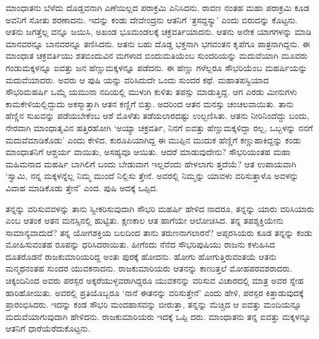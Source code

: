 ಮಾಂಧಾತನು ಬೆಳೆದು ದೊಡ್ಡವನಾಗಿ ಎಣೆಯಿಲ್ಲದ ಪರಾಕ್ರಮಿ ಎನಿಸಿದನು. ರಾವಣ ನಂತಹ ಮಹಾ ಪರಾಕ್ರಮಿ ಕೂಡ ಅವನಿಗೆ ಸೋತು ಶರಣಾದನು. ಇದನ್ನು ಕಂಡು ದೇವೇಂದ್ರನು ಆತನಿಗೆ ‘ತ್ರಸದ್ದಸ್ಯು’ ಎಂದು ಬಿರುದನ್ನು ಕೊಟ್ಟನು. ಆತನು ಜಗತ್ತೆಲ್ಲ ವನ್ನೂ ಜಯಿಸಿ, ಅಖಂಡ ಭೂಮಂಡಲಕ್ಕೆ ಚಕ್ರವರ್ತಿಯಾದನು. ಆತನು ಅನೇಕ ಯಾಗಗಳನ್ನು ಮಾಡಿ ಮಾನವರನ್ನೂ ಬಾನವರನ್ನೂ ತಣಿಸಿದನು. ಆತನು ಬಹು ದೊಡ್ಡ ಭಕ್ತನಾಗಿ ಭಗವಂತನ ಕೃಪೆಗೂ ಪಾತ್ರನಾಗಿದ್ದನು. ಈ ಮಾಂಧಾತ ಚಕ್ರವರ್ತಿಯು ಶತಬಿಂದುವಿನ ಮಗಳಾದ ಬಿಂದುಮತಿಯೆಂಬ ಸುಂದರಿಯನ್ನು ಮದುವೆಯಾಗಿ ಮೂವರು ಗಂಡುಮಕ್ಕಳನ್ನೂ ಐವತ್ತು ಜನ ಹೆಣ್ಣುಮಕ್ಕಳನ್ನೂ ಪಡೆದನು. ಈ ಹೆಣ್ಣು ಗಳೆಲ್ಲರೂ ಸೌಭರಿಯೆಂಬ ಮಹರ್ಷಿಯನ್ನು ಮದುವೆಯಾದರು. ಅವರು ಆ ಪುಷಿ ಯನ್ನು ವರಿಸಿದುದೇ ಒಂದು ಸುಂದರ ಕಥೆ. ಮಹಾತಪಸ್ವಿಯಾದ ಸೌಭರಿಮಹರ್ಷಿ ಒಮ್ಮೆ ಯಮುನಾ ನದಿಯಲ್ಲಿ ಮುಳುಗಿ ಕುಳಿತು ತಪಸ್ಸು ಮಾಡುತ್ತಿದ್ದ. ಆಗ ಎರಡು ಮೀನುಗಳು ಕಾಮಕೇಳಿಯಲ್ಲಿದ್ದುದು ಅಕಸ್ಮಾತ್ತಾಗಿ ಆತನ ಕಣ್ಣಿಗೆ ಬಿತ್ತು. ಅದರಿಂದ ಆತನ ಮನಸ್ಸು ಚಂಚಲವಾಯಿತು. ತಾನು ಹೆಣ್ಣಿನ ಸುಖವನ್ನು ಪಡೆಯಬೇಕೆಂಬ ಆಶೆ ಮೊಳೆತು ತಡೆಯಲಾರದಷ್ಟು ಉಲ್ಬಣಿಸಿತು. ಆತನು ನೀರಿನಿಂದೆದ್ದು ಬಂದು, ನೇರವಾಗಿ ಮಾಂಧಾತೃವಿನ ಹತ್ತಿರಹೋಗಿ ‘ಅಯ್ಯಾ ಚಕ್ರವರ್ತಿ, ನಿನಗೆ ಐವತ್ತು ಹೆಣ್ಣುಮಕ್ಕಳಿದ್ದಾ ರಲ್ಲ, ಒಬ್ಬಳನ್ನು ನನಗೆ ಮದುವೆಮಾಡಿಕೊಡು’ ಎಂದು ಕೇಳಿದ. ಕುರೂಪಿಯಾಗಿದ್ದ ಈ ಮುಪ್ಪಿನ ಮುದುಕ ಹೆಣ್ಣಿಗೆ ಕಣ್ಣುಹಾಕಿದ್ದನ್ನು ಕಂಡು ಮಾಂಧಾತನಿಗೆ ಆಶ್ಚರ್ಯ ವಾಯಿತು, ಅಸಹ್ಯವೂ ಆಯಿತು. ಆದರೆ ಮಾಡುವುದೇನು? ಸೌಭರಿಯಂತಹ ಮಹಾ ಮಹಿಮನಾದ ಮಹರ್ಷಿ ಬಾಗಿಲಿಗೆ ಬಂದು ಬೇಡುವಾಗ ಇಲ್ಲವೆಂದು ಹೇಳಲಾಗು ತ್ತದೆಯೆ? ಆತ ಉಪಾಯವಾಗಿ ‘ಸ್ವಾಮಿ, ನನ್ನ ಮಕ್ಕಳನ್ನೆಲ್ಲ ನಿಮ್ಮ ಮುಂದೆ ನಿಲ್ಲಿಸು ತ್ತೇನೆ. ಅವರಲ್ಲಿ ನಿಮ್ಮನ್ನು ಯಾವಳು ವರಿಸುತ್ತಾಳೊ ಅವಳನ್ನು ವಿವಾಹ ಮಾಡಿಕೊಡು ತ್ತೇನೆ’ ಎಂದ. ಪುಷಿ ಅದಕ್ಕೆ ಒಪ್ಪಿದ.

ತನ್ನನ್ನು ವರಿಸುವವಳನ್ನು ತಾನು ಸ್ವೀಕರಿಸುವುದಾಗಿ ಸೌಭರಿ ಮಹರ್ಷಿ ಹೇಳಿದ ನಾದರೂ, ತನ್ನನ್ನು ಯಾರು ವರಿಸಿಯಾರು ಎಂಬ ಆತಂಕ ಆತನ ಮನಸ್ಸಿನಲ್ಲಿ ಹುಟ್ಟಿತು. ಕ್ಷಣಕಾಲ ಆತ ಹಾಗೆಯೇ ಆಲೋಚಿಸಿದ. ತನ್ನ ತಪಶ್ಶಕ್ತಿಯೇನು ಸಾಮಾನ್ಯವಾದುದೆ? ತನ್ನ ಯೋಗಶಕ್ತಿಯ ಬಲದಿಂದ ತಾನು ತರುಣನಾಗಲಾರನೆ? ಅಪ್ಸರಸಿಯರು ಕೂಡ ತನ್ನನ್ನು ಕಂಡು ಮೋಹಿಸುವಂತಹ ರೂಪನ್ನು ಧರಿಸಿದರಾಯಿತು. ಹೀಗೆಂದು ನೆನೆದ ಸೌಭರಿಪುಷಿಯು ರಾಜನು ಕಳುಹಿಸಿದ ದೂತರೊಡನೆ ರಾಜಕುಮಾರಿಯರಿದ್ದ ಅಂತಃ ಪುರಕ್ಕೆ ಹೋದನು. ಹೋಗು ಹೋಗುತ್ತಿರುವಂತಯೆ ಆತನು ಮನ್ಮಥನಂತಹ ಸುಂದರ ಯುವಕನಾದನು. ರಾಜಕುಮಾರಿಯರು ಆತನನ್ನು ಕಾಣುತ್ತಲೆ ಮೋಹಪರವಶರಾದರು. ಚಿಕ್ಕಂದಿನಿಂದ ಅವರು ಪರಸ್ಪರ ಅಕ್ಕರೆಯುಳ್ಳವರಾಗಿದ್ದರೂ ಯುವಕನನ್ನು ವರಿಸುವ ವಿಚಾರದಲ್ಲಿ ಮಾತ್ರ ಅವರ ಸ್ನೇಹ ಹಾರಿಹೋಯಿತು. ಅವರಲ್ಲಿ ಪ್ರತಿಯೊಬ್ಬರೂ ‘ನಾನೆ ಈತನನ್ನು ವರಿಸುತ್ತೇನೆ’ ಎಂದು ಹೇಳಿ, ಪರಸ್ಪರ ಕಿತ್ತಾಡುವುದಕ್ಕೆ ಪ್ರಾರಂಭಿಸಿದರು. ಇದನ್ನು ಕಂಡ ಸೌಭರಿ ಮಂದಹಾಸವನ್ನು ಬೀರುತ್ತಾ, ತನ್ನನ್ನು ಮೆಚ್ಚಿದ ಆ ಐವತ್ತು ಮಂದಿಯನ್ನೂ ಮದುವೆಯಾಗುವುದಾಗಿ ಹೇಳಿದನು. ರಾಜಕುಮಾರಿಯರು ಇದಕ್ಕೆ ಒಪ್ಪಿ ದರು. ಮಾಂಧಾತನು ತನ್ನ ಐವತ್ತು ಮಕ್ಕಳನ್ನೂ ಆತನಿಗೆ ಧಾರೆಯೆರೆದುಕೊಟ್ಟನು.

